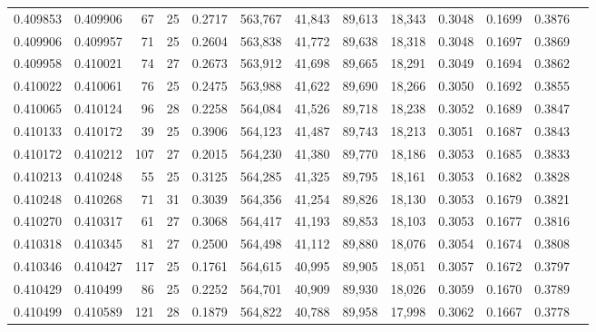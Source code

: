 \begin{tabular}{rrrrrrrrrrrrr}
0.409853 & 0.409906 &    67 &  25 &                                     0.2717 & 563,767 &  41,843 &  89,613 &  18,343 & 0.3048 & 0.1699 & 0.3876 \\
0.409906 & 0.409957 &    71 &  25 &                                     0.2604 & 563,838 &  41,772 &  89,638 &  18,318 & 0.3048 & 0.1697 & 0.3869 \\
0.409958 & 0.410021 &    74 &  27 &                                     0.2673 & 563,912 &  41,698 &  89,665 &  18,291 & 0.3049 & 0.1694 & 0.3862 \\
0.410022 & 0.410061 &    76 &  25 &                                     0.2475 & 563,988 &  41,622 &  89,690 &  18,266 & 0.3050 & 0.1692 & 0.3855 \\
0.410065 & 0.410124 &    96 &  28 &                                     0.2258 & 564,084 &  41,526 &  89,718 &  18,238 & 0.3052 & 0.1689 & 0.3847 \\
0.410133 & 0.410172 &    39 &  25 &                                     0.3906 & 564,123 &  41,487 &  89,743 &  18,213 & 0.3051 & 0.1687 & 0.3843 \\
0.410172 & 0.410212 &   107 &  27 &                                     0.2015 & 564,230 &  41,380 &  89,770 &  18,186 & 0.3053 & 0.1685 & 0.3833 \\
0.410213 & 0.410248 &    55 &  25 &                                     0.3125 & 564,285 &  41,325 &  89,795 &  18,161 & 0.3053 & 0.1682 & 0.3828 \\
0.410248 & 0.410268 &    71 &  31 &                                     0.3039 & 564,356 &  41,254 &  89,826 &  18,130 & 0.3053 & 0.1679 & 0.3821 \\
0.410270 & 0.410317 &    61 &  27 &                                     0.3068 & 564,417 &  41,193 &  89,853 &  18,103 & 0.3053 & 0.1677 & 0.3816 \\
0.410318 & 0.410345 &    81 &  27 &                                     0.2500 & 564,498 &  41,112 &  89,880 &  18,076 & 0.3054 & 0.1674 & 0.3808 \\
0.410346 & 0.410427 &   117 &  25 &                                     0.1761 & 564,615 &  40,995 &  89,905 &  18,051 & 0.3057 & 0.1672 & 0.3797 \\
0.410429 & 0.410499 &    86 &  25 &                                     0.2252 & 564,701 &  40,909 &  89,930 &  18,026 & 0.3059 & 0.1670 & 0.3789 \\
0.410499 & 0.410589 &   121 &  28 &                                     0.1879 & 564,822 &  40,788 &  89,958 &  17,998 & 0.3062 & 0.1667 & 0.3778 \\

\end{tabular}
